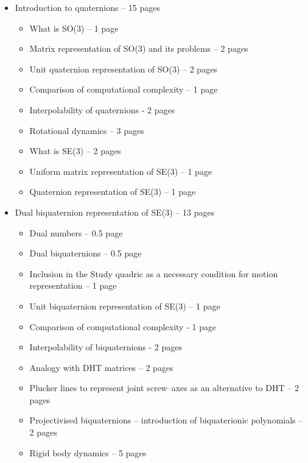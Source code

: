 \begin{itemize}
        \item Introduction to quaternions -- 15 pages
            \begin{itemize}
                \item What is SO(3) -- 1 page
                \item Matrix representation of SO(3) and its problems -- 2 pages
                \item Unit quaternion representation of SO(3) -- 2 pages
                \item Comparison of computational complexity -- 1 page
                \item Interpolability of quaternions - 2 pages
                \item Rotational dynamics -- 3 pages
                \item What is SE(3) -- 2 pages
                \item Uniform matrix representation of SE(3) -- 1 page
                \item Quaternion representation of SE(3) -- 1 page
            \end{itemize}
        \item Dual biquaternion representation of SE(3) -- 13 pages
            \begin{itemize}
                    \item Dual numbers -- 0.5 page
                    \item Dual biquaternions -- 0.5 page
                    \item Inclusion in the Study quadric as a necessary condition for motion representation -- 1 page
                    \item Unit biquaternion representation of SE(3) -- 1 page
                    \item Comparison of computational complexity - 1 page
                    \item Interpolability of biquaternions - 2 pages
                    \item Analogy with DHT matrices -- 2 pages
                    \item Plucker lines to represent joint screw--axes as an alternative to DHT -- 2 pages
                    \item Projectivised biquaternions -- introduction of biquaterionic polynomials -- 2 pages
                    \item Rigid body dynamics -- 5 pages
            \end{itemize}

\end{itemize}
